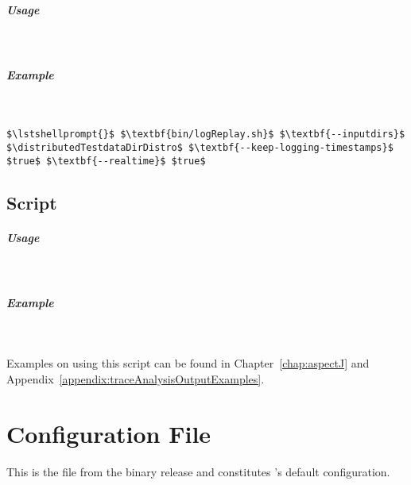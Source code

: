 \paragraph*{Usage}\

\setTextListing


\paragraph*{Example}\

\setTextListing
\begin{lstlisting}
$\lstshellprompt{}$ $\textbf{bin/logReplay.sh}$ $\textbf{--inputdirs}$ $\distributedTestdataDirDistro$ $\textbf{--keep-logging-timestamps}$ $true$ $\textbf{--realtime}$ $true$
\end{lstlisting}

\section{Script }

\paragraph*{Usage}\

\setTextListing


\paragraph*{Example}\

Examples on using this script can be found in Chapter~\ref{chap:aspectJ} and %
Appendix~\ref{appendix:traceAnalysisOutputExamples}.

\chapter{\KiekerMonitoringPart{} Configuration File}\label{sec:appdx:monitoringproperties}

This is the file \file{\monitoringPropertiesFile} from the binary release and 
constitutes \KiekerMonitoringPart{}'s default configuration.

\

\setXMLListing
